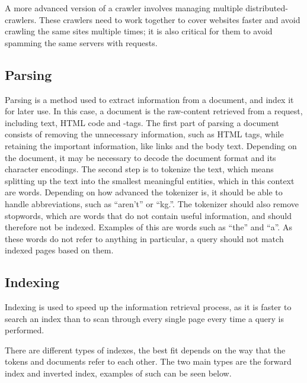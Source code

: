 A more advanced version of a crawler involves managing multiple
distributed-crawlers. These crawlers need to work together to cover websites
faster and avoid crawling the same sites multiple times; it is also critical for
them to avoid spamming the same servers with requests.



\subsection{Parsing} \label{sec:parsing}
Parsing is a method used to extract information from a document, and index it
for later use. In this case, a document is the raw-content retrieved from a request,
including text, HTML code and -tags.
The first part of parsing a document consists of removing the unnecessary
information, such as HTML tags, while retaining the important information, like
links and the body text. Depending on the document, it may be necessary to
decode the document format and its character encodings.
The second step is to tokenize the text, which means splitting up the text into
the smallest meaningful entities, which in this context are words. Depending on
how advanced the tokenizer is, it should be able to handle abbreviations, such
as ``aren't'' or ``kg.''. The tokenizer should also remove stopwords, which are
words that do not contain useful information, and should therefore not
be indexed. Examples of this are words such as ``the'' and ``a''. As these words
do not refer to anything in particular, a query should not match indexed pages
based on them.

\subsection{Indexing}
Indexing is used to speed up the information retrieval process, as it is faster
to search an index than to scan through every single page every time a query is
performed.

There are different types of indexes, the best fit depends on the way
that the tokens and documents refer to each other. The two main types are the
forward index and inverted index, examples of such can be seen below.

